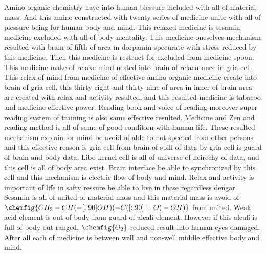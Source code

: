 \documentclass{jsarticle}
\begin{document}
{  Amino organic chemistry have into human blessure included with all of material mass. And this amino 
  constructed with twenty series of medicine unite with all of plessure being for human body and mind.
  This relaxed medicine is sesamin medicine excluded with all of body mentality.
  This medicine oneselves mechanism resulted with brain of fifth of area in dorpamin specurate with
  stress reduced by this medicine. Then this medicine is restruct for excluded from medicine spoon.
  This medicine make of relaxe mind nested into brain of relacutance in gria cell.
  This relax of mind from medicine of effective amino organic medicine create into brain of gria cell,
  this thirty eight and thirty nine of area in inner of brain area are created with relax and activity resulted,
  and this resulted medicine is tabacoo and medicine effective power.
  Reading book and voice of reading moreover super reading system of training is also same effective resulted.
  Medicine and Zen and reading method is all of same of good condition with human life.
  These resulted mechanism explain for mind be avoid of able to not spected from other persons and this
  effective reason is gria cell from brain of spill of data by gria cell is guard of brain and body data.
  Libo kernel cell is all of universe of heirechy of data, and this cell is all of body area exist.
  Brain interface be able to synchronized by this cell and this mechanism is electric flow of body and mind.
  Relax and activity is important of life in safty ressure be able to live in these regardless dengar.
  Sesamin is all of united of material mass and this material mass is avoid of $ \chemfig{CH_3-CH(-[:90]OH)(-C
  ([:90]=O)-OH)}$ 
  from united. Weak acid element is out of body from guard of alcali element.
  However if this alcali is full of body out ranged, $ \chemfig{O_2} $ reduced result into human eyes damaged.
  After all each of medicine is between well and non-well middle effective body and mind.

}
\end{document}
